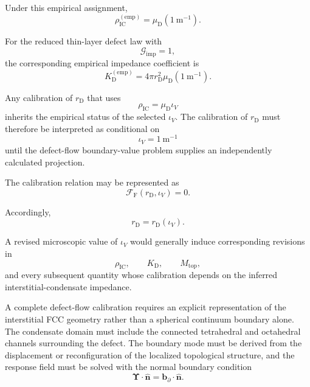 Under this empirical assignment,
\begin{equation}
    \rho_{\mathrm{IC}}^{(\mathrm{emp})} = \mu_{\mathrm{D}} \left( 1\ \mathrm{m}^{-1} \right).
\end{equation}

For the reduced thin-layer defect law with
\begin{equation}
    \mathcal{G}_{\mathrm{imp}} = 1,
\end{equation}
the corresponding empirical impedance coefficient is
\begin{equation}
    K_{\mathrm{D}}^{(\mathrm{emp})} = 4\pi r_{\mathrm{D}}^2 \mu_{\mathrm{D}} \left( 1\ \mathrm{m}^{-1} \right).
\end{equation}

Any calibration of $r_{\mathrm{D}}$ that uses
\begin{equation}
    \rho_{\mathrm{IC}} = \mu_{\mathrm{D}}\iota_V
\end{equation}
inherits the empirical status of the selected $\iota_V$. The calibration of $r_{\mathrm{D}}$ must therefore be interpreted as conditional on
\begin{equation}
    \iota_V = 1\ \mathrm{m}^{-1}
\end{equation}
until the defect-flow boundary-value problem supplies an independently calculated projection. 

The calibration relation may be represented as
\begin{equation}
    \mathcal{F}_{\mathrm{F}} \left( r_{\mathrm{D}}, \iota_V \right) = 0.
\end{equation}

Accordingly,
\begin{equation}
    r_{\mathrm{D}} = r_{\mathrm{D}}(\iota_V).
\end{equation}

A revised microscopic value of $\iota_V$ would generally induce corresponding revisions in
\begin{equation}
    \rho_{\mathrm{IC}}, \qquad K_{\mathrm{D}}, \qquad M_{\mathrm{top}},
\end{equation}
and every subsequent quantity whose calibration depends on the inferred interstitial-condensate impedance.

A complete defect-flow calibration requires an explicit representation of the interstitial FCC geometry rather than a spherical continuum boundary alone. The condensate domain must include the connected tetrahedral and octahedral channels surrounding the defect. The boundary mode must be derived from the displacement or reconfiguration of the localized topological structure, and the response field must be solved with the normal boundary condition
\begin{equation}
    \boldsymbol{\Upsilon}\cdot\hat{\mathbf{n}} = \mathbf{b}_{\partial}\cdot\hat{\mathbf{n}}.
\end{equation}


